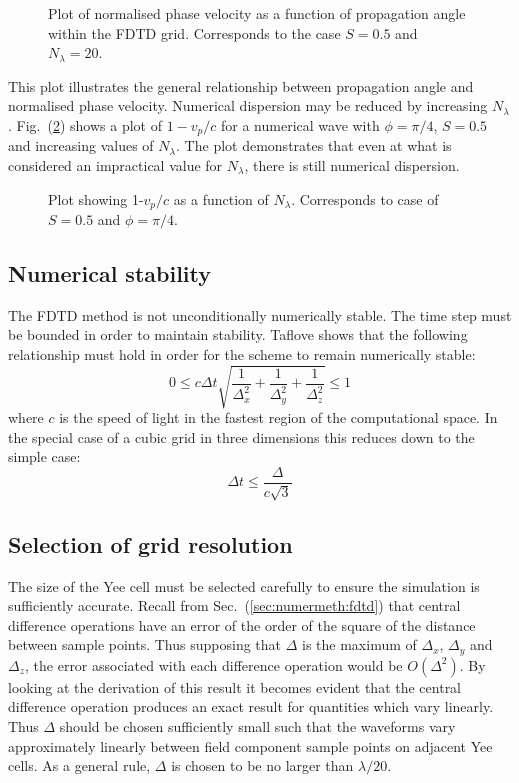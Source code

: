 \documentclass[a4paper, 12pt]{article}
\newcommand{\rfig}[1]{Fig.\ (\ref{#1})}
\newcommand{\sect}[1]{Sec.\ (\ref{#1})}
\begin{document}
	\begin{figure}[!h]
		\centering
		\caption{Plot of normalised phase velocity as a function of
			propagation angle within the FDTD grid. Corresponds to the case
			$S=0.5$ and $N_\lambda=20$.}
		\label{fig:fdtd:numdispphi}
	\end{figure}
	This plot illustrates the general relationship between propagation
	angle and normalised phase velocity. Numerical dispersion may be
	reduced by increasing $N_\lambda$. \rfig{fig:fdtd:numdispN} shows a
	plot of $1-v_p/c$ for a numerical wave with $\phi=\pi/4$, $S=0.5$ and
	increasing values of $N_\lambda$. The plot demonstrates that even at
	what is considered an impractical value for $N_\lambda$, there is
	still numerical dispersion.
	\begin{figure}[!h]
		\centering
		\caption{Plot showing 1-$v_p/c$ as a function of
			$N_\lambda$. Corresponds to case of $S=0.5$ and $\phi=\pi/4$.}
		\label{fig:fdtd:numdispN}
	\end{figure}
	\subsection{Numerical stability}
	The FDTD method is not unconditionally numerically stable. The time
	step must be bounded in order to maintain stability. Taflove
	\cite{taflove00book} shows that the following relationship must hold
	in order for the scheme to remain numerically stable:
	\begin{equation}
		\label{eq:fdtd:stab}
		0\le c\Delta t\sqrt{\frac{1}{\Delta^2_x}+\frac{1}{\Delta^2_y}+\frac{1}{\Delta^2_z}}\le1
	\end{equation}
	where $c$ is the speed of light in the fastest region of the
	computational space. In the special case of a cubic grid in three
	dimensions this reduces down to the simple case:
	\begin{equation}
		\Delta t\le\frac{\Delta}{c\sqrt{3}}
		\label{eq:fdtd:stabsimp}
	\end{equation}
	\subsection{Selection of grid resolution}
	The size of the Yee cell must be selected carefully to ensure the
	simulation is sufficiently accurate. Recall from
	\sect{sec:numermeth:fdtd} that central difference operations have an
	error of the order of the square of the distance between sample
	points. Thus supposing that $\Delta$ is the maximum of $\Delta_x$,
	$\Delta_y$ and $\Delta_z$, the error associated with each difference
	operation would be $O(\Delta^2)$. By looking at the derivation of this
	result it becomes evident that the central difference operation
	produces an exact result for quantities which vary linearly. Thus
	$\Delta$ should be chosen sufficiently small such that the waveforms
	vary approximately linearly between field component sample points on
	adjacent Yee cells. As a general rule, $\Delta$ is chosen to be no larger than
	$\lambda/20$.
\end{document}
